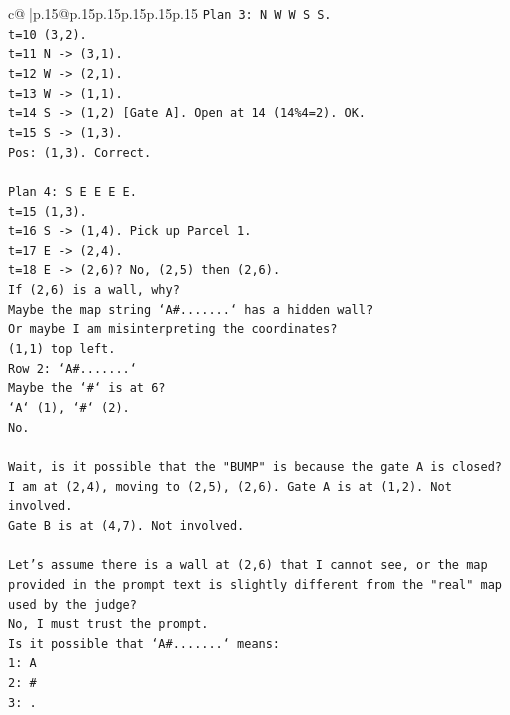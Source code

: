 \documentclass{article}
\begin{document}
{\begin{supertabular}{c@{$\;$}|p{.15\linewidth}@{}p{.15\linewidth}p{.15\linewidth}p{.15\linewidth}p{.15\linewidth}p{.15\linewidth}}
{{{\texttt{Plan 3: N W W S S.} \\
\texttt{t=10 (3,2).} \\
\texttt{t=11 N {-}> (3,1).} \\
\texttt{t=12 W {-}> (2,1).} \\
\texttt{t=13 W {-}> (1,1).} \\
\texttt{t=14 S {-}> (1,2) {[}Gate A{]}. Open at 14 (14\%4=2). OK.} \\
\texttt{t=15 S {-}> (1,3).} \\
\texttt{Pos: (1,3). Correct.} \\
\\ 
\texttt{Plan 4: S E E E E.} \\
\texttt{t=15 (1,3).} \\
\texttt{t=16 S {-}> (1,4). Pick up Parcel 1.} \\
\texttt{t=17 E {-}> (2,4).} \\
\texttt{t=18 E {-}> (2,6)? No, (2,5) then (2,6).} \\
\texttt{If (2,6) is a wall, why?} \\
\texttt{Maybe the map string `A\#.......` has a hidden wall?} \\
\texttt{Or maybe I am misinterpreting the coordinates?} \\
\texttt{(1,1) top left.} \\
\texttt{Row 2: `A\#.......`} \\
\texttt{Maybe the `\#` is at 6?} \\
\texttt{`A` (1), `\#` (2).} \\
\texttt{No.} \\
\\ 
\texttt{Wait, is it possible that the "BUMP" is because the gate A is closed?} \\
\texttt{I am at (2,4), moving to (2,5), (2,6). Gate A is at (1,2). Not involved.} \\
\texttt{Gate B is at (4,7). Not involved.} \\
\\ 
\texttt{Let's assume there is a wall at (2,6) that I cannot see, or the map provided in the prompt text is slightly different from the "real" map used by the judge?} \\
\texttt{No, I must trust the prompt.} \\
\texttt{Is it possible that `A\#.......` means:} \\
\texttt{1: A} \\
\texttt{2: \#} \\
\texttt{3: .} \\
}}}
\end{supertabular}}
\end{document}
